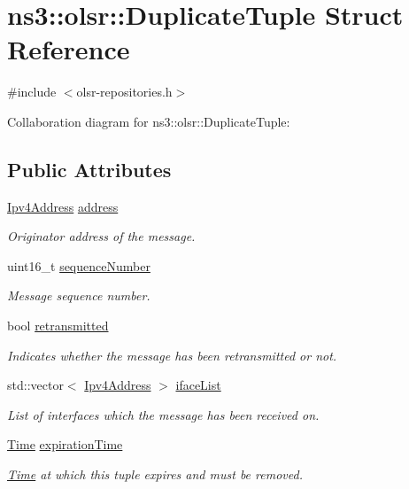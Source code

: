 \hypertarget{structns3_1_1olsr_1_1DuplicateTuple}{}\section{ns3\+:\+:olsr\+:\+:Duplicate\+Tuple Struct Reference}
\label{structns3_1_1olsr_1_1DuplicateTuple}


{\ttfamily \#include $<$olsr-\/repositories.\+h$>$}



Collaboration diagram for ns3\+:\+:olsr\+:\+:Duplicate\+Tuple\+:
\subsection*{Public Attributes}
\begin{DoxyCompactItemize}
\item 
\hyperlink{classns3_1_1Ipv4Address}{Ipv4\+Address} \hyperlink{structns3_1_1olsr_1_1DuplicateTuple_a3e13889658808580ccdf5b4eb930f4ab}{address}
\begin{DoxyCompactList}\small\item\em Originator address of the message. \end{DoxyCompactList}\item 
uint16\+\_\+t \hyperlink{structns3_1_1olsr_1_1DuplicateTuple_a6d641a58306414310e21b7acfc1aa832}{sequence\+Number}
\begin{DoxyCompactList}\small\item\em Message sequence number. \end{DoxyCompactList}\item 
bool \hyperlink{structns3_1_1olsr_1_1DuplicateTuple_acab89a10cc5023318dc97c5adbb4789b}{retransmitted}
\begin{DoxyCompactList}\small\item\em Indicates whether the message has been retransmitted or not. \end{DoxyCompactList}\item 
std\+::vector$<$ \hyperlink{classns3_1_1Ipv4Address}{Ipv4\+Address} $>$ \hyperlink{structns3_1_1olsr_1_1DuplicateTuple_a3649a1e89ec9b976cc4c74d1ebb7c9b1}{iface\+List}
\begin{DoxyCompactList}\small\item\em List of interfaces which the message has been received on. \end{DoxyCompactList}\item 
\hyperlink{classns3_1_1Time}{Time} \hyperlink{structns3_1_1olsr_1_1DuplicateTuple_af4b2054d69cf16961b37d482214c0a0e}{expiration\+Time}
\begin{DoxyCompactList}\small\item\em \hyperlink{classns3_1_1Time}{Time} at which this tuple expires and must be removed. \end{DoxyCompactList}\end{DoxyCompactItemize}


